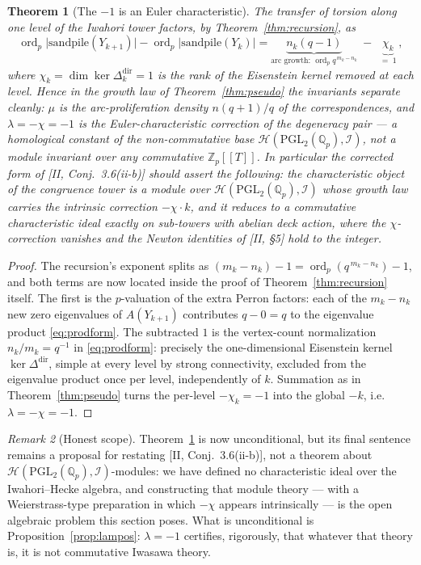 \documentclass[11pt]{amsart}
\numberwithin{equation}{section}
\newtheorem{theorem}{Theorem}[section]
\theoremstyle{definition}
\theoremstyle{remark}
\newtheorem{remark}[theorem]{Remark}
\newcommand{\Z}{\mathbb{Z}}
\newcommand{\Q}{\mathbb{Q}}
\newcommand{\cH}{\mathcal{H}}
\newcommand{\cI}{\mathcal{I}}
\newcommand{\PGL}{\mathrm{PGL}}
\newcommand{\ord}{\operatorname{ord}}
\begin{document}
\begin{theorem}[The $-1$ is an Euler characteristic]\label{thm:euler}
The transfer of torsion along one level of the Iwahori tower factors, by
Theorem~\ref{thm:recursion}, as
\[
\ord_p\bigl|\mathrm{sandpile}(Y_{k+1})\bigr|-\ord_p\bigl|\mathrm{sandpile}(Y_k)\bigr|
=\underbrace{n_k(q-1)}_{\text{arc growth: }\ord_p q^{\,m_k-n_k}}
\;-\;\underbrace{\chi_k}_{\;=\;1\;},
\]
where $\chi_k=\dim\ker\Delta^{\mathrm{dir}}_{k}=1$ is the rank of the Eisenstein
kernel removed at each level. Hence in the growth law of Theorem~\ref{thm:pseudo} the
invariants separate cleanly: $\mu$ is the arc-proliferation density
$n(q+1)/q$ of the correspondences, and $\lambda=-\chi=-1$ is the Euler-characteristic
correction of the degeneracy pair --- a homological constant of the non-commutative
base $\cH(\PGL_2(\Q_p),\cI)$, not a module invariant over any commutative
$\Z_p[[T]]$. In particular the corrected form of [II, Conj.~3.6(ii-b)] should assert
the following: the characteristic object of the congruence tower is a module over
$\cH(\PGL_2(\Q_p),\cI)$ whose growth law carries the intrinsic correction
$-\chi\cdot k$, and it reduces to a commutative characteristic ideal exactly on
sub-towers with abelian deck action, where the $\chi$-correction vanishes and the
Newton identities of [II, \S5] hold to the integer.
\end{theorem}

\begin{proof}
The recursion's exponent splits as $(m_k-n_k)-1=\ord_p(q^{\,m_k-n_k})-1$, and both
terms are now located inside the proof of Theorem~\ref{thm:recursion} itself. The
first is the $p$-valuation of the extra Perron factors: each of the $m_k-n_k$ new
zero eigenvalues of $A(Y_{k+1})$ contributes $q-0=q$ to the eigenvalue product
\eqref{eq:prodform}. The subtracted $1$ is the vertex-count normalization
$n_k/m_k=q^{-1}$ in \eqref{eq:prodform}: precisely the one-dimensional Eisenstein
kernel $\ker\Delta^{\mathrm{dir}}$, simple at every level by strong connectivity,
excluded from the eigenvalue product once per level, independently of $k$. Summation
as in Theorem~\ref{thm:pseudo} turns the per-level $-\chi_k=-1$ into the global
$-k$, i.e.\ $\lambda=-\chi=-1$.
\end{proof}

\begin{remark}[Honest scope]\label{rem:scope2}
Theorem~\ref{thm:euler} is now unconditional, but its final sentence remains a
proposal for restating
[II, Conj.~3.6(ii-b)], not a theorem about $\cH(\PGL_2(\Q_p),\cI)$-modules: we have
defined no characteristic ideal over the Iwahori--Hecke algebra, and constructing that
module theory --- with a Weierstrass-type preparation in which $-\chi$ appears
intrinsically --- is the open algebraic problem this section poses. What is
unconditional is Proposition~\ref{prop:lampos}: $\lambda=-1$ certifies, rigorously,
that whatever that theory is, it is not commutative Iwasawa theory.
\end{remark}
\end{document}
